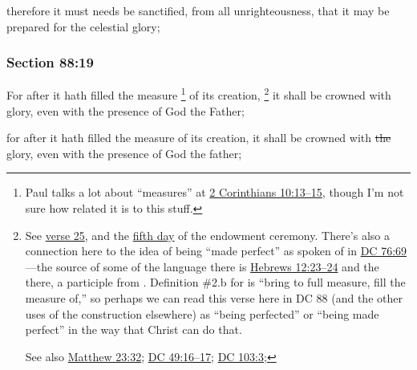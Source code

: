 		\begin{framed}
		\scriptsize
			\begin{compactdesc}
				\item[JSP] therefore it must needs be sanctified, from all unrighteousness, that it may be prepared for the celestial glory;
			\end{compactdesc}
		\end{framed}

	\subsubsection{Section 88:19} %
		\label{DC88-19}

		For after it hath filled the measure%
			\footnote{%
				Paul talks a lot about ``measures'' at \hyperref[2CORINTHIANS-10-13]{2 Corinthians 10:13--15}, though I'm not sure how related it is to this stuff.
				}
		of its creation,%
			\footnote{%
				\label{DC88-19-measure}%
				See \hyperref[DC88-25]{verse 25}, and the \hyperref[TEMPLE-ENDOWMENT-ENDOW-PRE-1990-DAY5]{fifth day} of the endowment ceremony. There's also a connection here to the idea of being ``made perfect'' as spoken of in \hyperref[DC76-69]{DC 76:69}---the source of some of the language there is \hyperref[HEBREWS-12-23]{Hebrews 12:23--24} and the  there, a participle from \hyperref[TELEIOO]{}. Definition \#2.b for  is ``bring to full measure, fill the measure of,'' so perhaps we can read this verse here in DC 88 (and the other uses of the construction elsewhere) as ``being perfected'' or ``being made perfect'' in the way that Christ can do that.
				
				See also \hyperref[MATTHEW-23-32]{Matthew 23:32}; \hyperref[DC49-16]{DC 49:16--17}; \hyperref[DC103-3]{DC 103:3}; 
				}
		it shall be crowned with glory, even with the presence of God the Father;

		\begin{framed}
		\scriptsize
			\begin{compactdesc}
				\item[JSP] for after it hath filled the measure of its creation, it shall be crowned with \sout{the} glory, even with the presence of God the father;
			\end{compactdesc}
		\end{framed}

